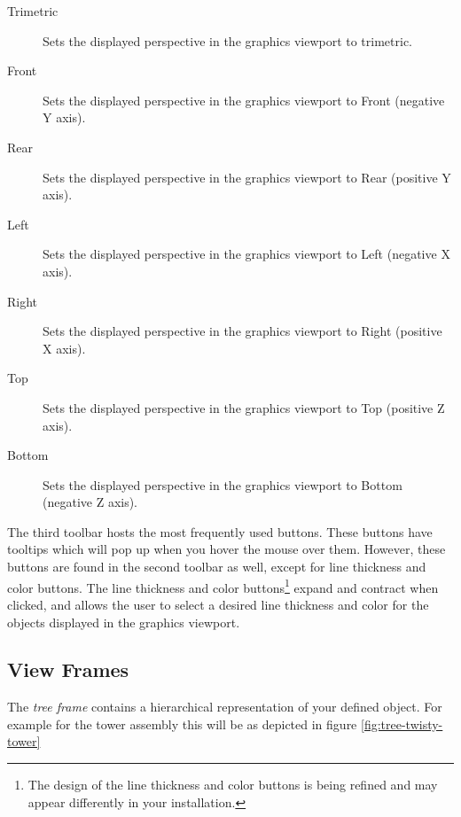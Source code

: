 \documentclass [11pt]{book}
\begin{document}
\begin{itemize}
\begin{description}
\item [Trimetric]
Sets the displayed perspective in the graphics viewport to trimetric.

\item [Front]
Sets the displayed perspective in the graphics viewport to Front (negative Y axis).

\item [Rear]
Sets the displayed perspective in the graphics viewport to Rear (positive Y axis).

\item [Left]
Sets the displayed perspective in the graphics viewport to Left (negative X axis).

\item [Right]
Sets the displayed perspective in the graphics viewport to Right (positive X axis).

\item [Top]
Sets the displayed perspective in the graphics viewport to Top (positive Z axis).

\item [Bottom]
Sets the displayed perspective in the graphics viewport to Bottom (negative Z axis).

\end{description}



\end{itemize}



The third toolbar hosts the most frequently used
buttons. These buttons have tooltips which will pop up when you hover
the mouse over them. However, these buttons are found in the second
toolbar as well, except for line thickness and color buttons. The line
thickness and color buttons\footnote{The design of the line thickness and color
buttons is being refined and may appear differently in your
installation.} expand and contract when clicked, and allows the user to
select a desired line thickness and color for the objects displayed in
the graphics viewport.



\subsection{View Frames}

\label{subsec:viewframes}



The \emph{tree frame} contains a hierarchical representation of your defined
object. For example for the tower assembly this will be as depicted in
figure 
\ref{fig:tree-twisty-tower}
\end{document}
